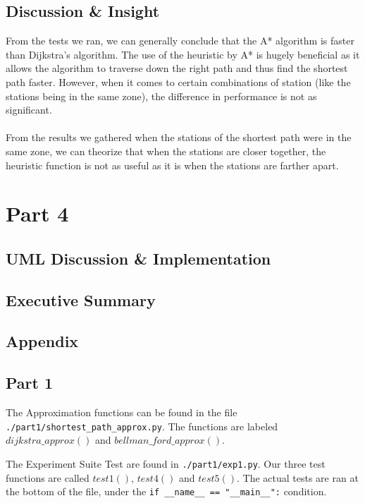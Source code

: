 \documentclass{article}
\begin{document}
\subsection{Discussion \& Insight}

From the tests we ran, we can generally conclude that the A* algorithm is faster than Dijkstra’s algorithm. The use of the heuristic by A* is hugely beneficial as it allows the algorithm to traverse down the right path and thus find the shortest path faster. However, when it comes to certain combinations of station (like the stations being in the same zone), the difference in performance is not as significant. \\
\\
From the results we gathered when the stations of the shortest path were in the same zone, we can theorize that when the stations are closer together, the heuristic function is not as useful as it is when the stations are farther apart.\\

\newpage
\section{Part 4}
\subsection{UML Discussion \& Implementation}

\newpage
\subsection{Executive Summary}


\newpage
\subsection{Appendix}

\subsection{Part 1}

The Approximation functions can be found in the file \verb|./part1/shortest_path_approx.py|.
The functions are labeled $dijkstra\_approx()$ and $bellman\_ford\_approx()$.

The Experiment Suite Test are found in \verb|./part1/exp1.py|. Our three test functions are called $test1()$, $test4()$ and  $test5()$. The actual tests are ran at the bottom of the file, under the \verb|if __name__ == "__main__":| condition.
\end{document}
